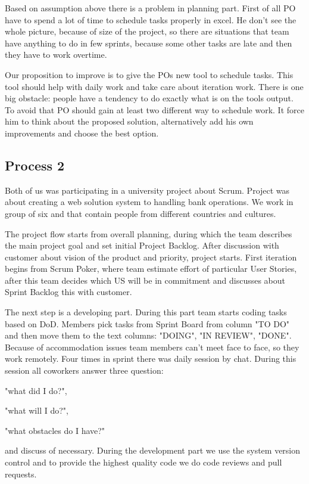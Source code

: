 Based on assumption above there is a problem in planning part. First of all PO have to spend a lot of time to schedule tasks properly in excel. He don't see the whole picture, because of size of the project, so there are situations that team have anything to do in few sprints, because some other tasks are late and then they have to work overtime. 

Our proposition to improve is to give the POs new tool to schedule tasks. This tool should help with daily work and take care about iteration work. There is one big obstacle: people have a tendency to do exactly what is on the tools output. To avoid that PO should gain at least two different way to schedule work. It force him to think about the proposed solution, alternatively add his own improvements and choose the best option. 

\subsection*{Process 2}

Both of us was participating in a university project about Scrum. Project was about creating a web solution system to handling bank operations. We work in group of six and that contain people from different countries and cultures. 

The project flow starts from overall planning, during which the team describes the main project goal and set initial Project Backlog. After discussion with customer about vision of the product and priority, project starts. First iteration begins from Scrum Poker, where team estimate effort of particular User Stories, after this team decides which US will be in commitment and discusses about Sprint Backlog this with customer.

The next step is a developing part. During this part team starts coding tasks based on DoD. Members pick tasks from Sprint Board from column "TO DO" and then move them to the text columns: "DOING", "IN REVIEW", "DONE". Because of accommodation issues team members can't meet face to face, so they work remotely. Four times in sprint there was daily session by chat. During this session all  coworkers answer three question:
\begin{inparaenum}
\item "what did I do?",
\item "what will I do?",
\item "what obstacles do I have?"
\end{inparaenum} and discuss of necessary.
During the development part we use the system version control and to provide the highest quality code we do code reviews and pull requests. 

